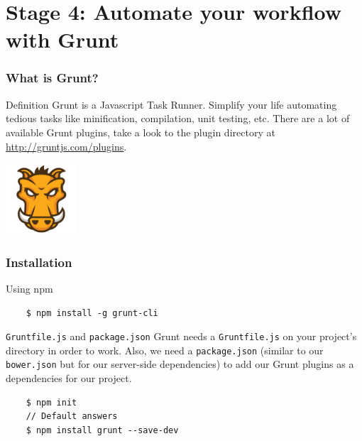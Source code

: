 \section{Stage 4: Automate your workflow with Grunt}

\begin{frame}[fragile]
\end{frame}

\begin{frame}[fragile]
  \frametitle{What is Grunt?}
  \begin{block}{Definition}
    Grunt is a Javascript Task Runner. Simplify your life automating tedious tasks like minification, compilation, unit testing, etc. There are a lot of available Grunt plugins, take a look to the plugin directory at \url{http://gruntjs.com/plugins}.
  \end{block}

  \begin{center}
    \includegraphics[width=100px]{images/grunt.png}
  \end{center}
\end{frame}

\begin{frame}[fragile]
  \frametitle{Installation}

  \begin{block}{Using npm}
  {\scriptsize
    \begin{verbatim}
    $ npm install -g grunt-cli
    \end{verbatim}
  }
  \end{block}

  \pause

  \begin{block}{\texttt{Gruntfile.js} and \texttt{package.json}}
    Grunt needs a \texttt{Gruntfile.js} on your project's directory in order to work. Also, we need a \texttt{package.json} (similar to our \texttt{bower.json} but for our server-side dependencies) to add our Grunt plugins as a dependencies for our project.
  {\scriptsize
    \begin{verbatim}
    $ npm init
    // Default answers
    $ npm install grunt --save-dev
    \end{verbatim}
  }
  \end{block}
\end{frame}


